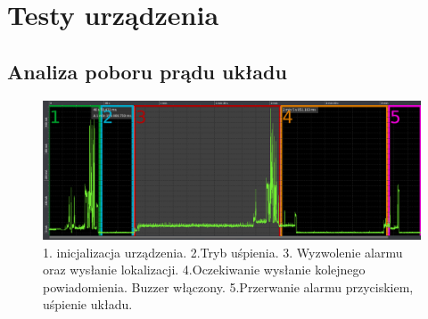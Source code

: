 \chapter{Testy urządzenia}
\section{Analiza poboru prądu układu}
\begin{figure}[h]
    \centering
    \includegraphics[width=16cm]{Graphics/connection_with_fix_divided.png}
    \caption{1. inicjalizacja urządzenia. 2.Tryb uśpienia. 3. Wyzwolenie alarmu oraz wysłanie lokalizacji. 4.Oczekiwanie wysłanie kolejnego powiadomienia. Buzzer włączony. 5.Przerwanie alarmu przyciskiem, uśpienie układu.}
    \label{img:current_summary}
\end{figure}